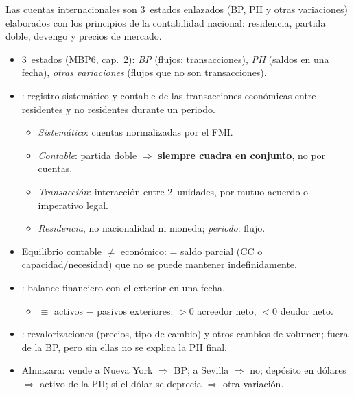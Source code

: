 \documentclass{article}
\begin{document}
\begin{columnas}
\begin{ideaclave}
Las cuentas internacionales son 3~estados enlazados (BP, PII y otras variaciones) elaborados con los principios de la contabilidad nacional: residencia, partida doble, devengo y precios de mercado.
\end{ideaclave}

\begin{itemize}
\item 3~estados (MBP6, cap.~2): \emph{BP} (flujos: transacciones), \emph{PII} (saldos en una fecha), \emph{otras variaciones} (flujos que no son transacciones).
\end{itemize}
\begin{itemize}
\item {}: registro sistemático y contable de las transacciones económicas entre residentes y no residentes durante un periodo.
  \begin{itemize}
  \item \emph{Sistemático}: cuentas normalizadas por el FMI.
  \item \emph{Contable}: partida doble $\Rightarrow$ \textbf{siempre cuadra en conjunto}, no por cuentas.
  \item \emph{Transacción}: interacción entre 2~unidades, por mutuo acuerdo o imperativo legal.
  \item \emph{Residencia}, no nacionalidad ni moneda; \emph{periodo}: flujo.
  \end{itemize}
\item Equilibrio contable $\neq$ económico:  = saldo parcial (CC o capacidad/necesidad) que no se puede mantener indefinidamente.
\end{itemize}
\begin{itemize}
\item {}: balance financiero con el exterior en una fecha.
  \begin{itemize}
  \item {} $\equiv$ activos $-$ pasivos exteriores: $>0$ acreedor neto, $<0$ deudor neto.
  \end{itemize}
\item {}: revalorizaciones (precios, tipo de cambio) y otros cambios de volumen; fuera de la BP, pero sin ellas no se explica la PII final.
\end{itemize}
\begin{itemize}
\item Almazara: vende a Nueva York $\Rightarrow$ BP; a Sevilla $\Rightarrow$ no; depósito en dólares $\Rightarrow$ activo de la PII; si el dólar se deprecia $\Rightarrow$ otra variación.
\end{itemize}


\end{columnas}
\end{document}
